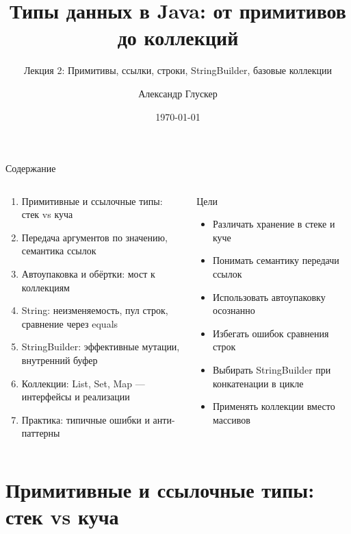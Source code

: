 \documentclass[aspectratio=169]{beamer}
\title{Типы данных в Java: от примитивов до коллекций}
\subtitle{Лекция 2: Примитивы, ссылки, строки, StringBuilder, базовые коллекции}
\author{Александр Глускер}
\institute{РУТ МИИТ/ВИШ}
\date{\today}
\begin{document}
\begin{frame}
  \titlepage
\end{frame}

\begin{frame}{Содержание}
  \begin{columns}[T,onlytextwidth]
    \begin{column}{0.55\textwidth}
      \begin{enumerate}
        \item Примитивные и ссылочные типы: стек vs куча
        \item Передача аргументов по значению, семантика ссылок
        \item Автоупаковка и обёртки: мост к коллекциям
        \item String: неизменяемость, пул строк, сравнение через equals
        \item StringBuilder: эффективные мутации, внутренний буфер
        \item Коллекции: List, Set, Map — интерфейсы и реализации
        \item Практика: типичные ошибки и анти-паттерны
      \end{enumerate}
    \end{column}
    \begin{column}{0.45\textwidth}
      \begin{block}{Цели}
        \begin{itemize}
          \item Различать хранение в стеке и куче
          \item Понимать семантику передачи ссылок
          \item Использовать автоупаковку осознанно
          \item Избегать ошибок сравнения строк
          \item Выбирать StringBuilder при конкатенации в цикле
          \item Применять коллекции вместо массивов
        \end{itemize}
      \end{block}
    \end{column}
  \end{columns}
\end{frame}

\section{Примитивные и ссылочные типы: стек vs куча}
\end{document}
